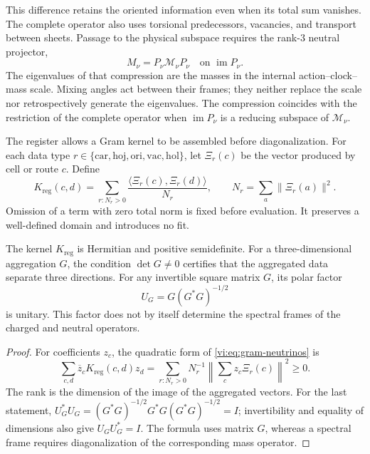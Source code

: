 This difference retains the oriented information even when its total
sum vanishes. The complete operator also uses torsional
predecessors, vacancies, and transport between sheets. Passage to the
physical subspace requires the rank-\(3\) neutral projector,
\[
 M_\nu=P_\nu\mathcal M_\nu P_\nu
 \quad\text{on }\operatorname{im}P_\nu.
\]
The eigenvalues of that compression are the masses in the internal
action--clock--mass scale. Mixing angles act between their frames;
they neither replace the scale nor retrospectively generate the eigenvalues.
The compression coincides with the restriction of the complete operator when
\(\operatorname{im}P_\nu\) is a reducing subspace of
\(\mathcal M_\nu\).

The register allows a Gram kernel to be assembled before diagonalization.
For each data type
\(r\in\{\mathrm{car},\mathrm{hoj},\mathrm{ori},\mathrm{vac},\mathrm{hol}\}\),
let \(\Xi_r(c)\) be the vector produced by cell or route \(c\).
Define
\begin{equation}
 K_{\mathrm{reg}}(c,d)=
 \sum_{r:N_r>0}\frac{\langle\Xi_r(c),\Xi_r(d)\rangle}{N_r},
 \qquad N_r=\sum_a\|\Xi_r(a)\|^2.
 \label{vi:eq:gram-neutrinos}
\end{equation}
Omission of a term with zero total norm is fixed before
evaluation. It preserves a well-defined domain and introduces no fit.

\begin{proposition}
\label{vi:prop:gram-neutrinos}
The kernel \(K_{\mathrm{reg}}\) is Hermitian and positive semidefinite.
For a three-dimensional aggregation \(G\), the condition \(\det G\ne0\)
certifies that the aggregated data separate three directions. For any
invertible square matrix \(G\), its polar factor
\[
 U_G=G(G^*G)^{-1/2}
\]
is unitary. This factor does not by itself determine the spectral frames
of the charged and neutral operators.
\end{proposition}
\begin{proof}
For coefficients \(z_c\), the quadratic form of
\eqref{vi:eq:gram-neutrinos} is
\[
 \sum_{c,d}\overline z_cK_{\mathrm{reg}}(c,d)z_d
 =\sum_{r:N_r>0}N_r^{-1}
 \left\|\sum_c z_c\Xi_r(c)\right\|^2\ge0.
\]
The rank is the dimension of the image of the aggregated vectors. For the
last statement,
\(U_G^*U_G=(G^*G)^{-1/2}G^*G(G^*G)^{-1/2}=I\);
invertibility and equality of dimensions also give \(U_GU_G^*=I\).
The formula uses matrix \(G\), whereas a spectral frame requires
diagonalization of the corresponding mass operator.
\end{proof}

